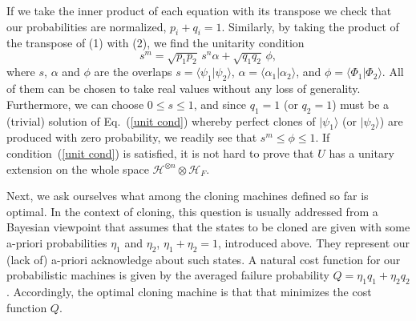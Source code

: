 \documentclass[aps,prl,twocolumn,showpacs]{revtex4}
\newcommand{\tr}{{\rm tr}\,}
\newcommand{\ke}[1]{|#1\rangle}
\newcommand{\bk}[2]{\langle #1|#2\rangle}
\begin{document}


If we take the inner product of each equation with its transpose we check that our probabilities are normalized, $p_i+q_i=1$.
Similarly, by taking the product of the transpose of (1) with (2), we find the unitarity condition
%
\begin{equation}
s^m=\sqrt{p_1 p_2}\, s^n \alpha+\sqrt{q_1 q_2}\,\phi,
\label{unit cond}
\end{equation}
%
where $s$, $\alpha$ and $\phi$ are the overlaps
$s = \bk {\psi_1}{\psi_2}$, $\alpha=\langle\alpha_1|\alpha_2\rangle$, and $ \phi=\langle\Phi_1|\Phi_2\rangle
$. All of them can be chosen to take real values without any loss of generality. Furthermore, we can choose $0\le s\le 1$, and since $q_1=1$ (or $q_2=1$) must be a (trivial) solution of Eq.~(\ref{unit cond}) whereby perfect clones of $|\psi_1\rangle$ (or $|\psi_2\rangle$) are produced with zero probability, we readily see that $s^m\le \phi\le 1$.  If condition~(\ref{unit cond}) is satisfied, it is not hard to prove that $U$ has a unitary extension on the whole space ${\mathscr H}^{\otimes n}\otimes{\mathscr H}_F$. 


Next, we ask ourselves what among the cloning machines defined so far is optimal. In the context of cloning, this question is usually addressed from a Bayesian viewpoint that assumes that the states to be cloned are given with some a-priori  probabilities $\eta_1$ and $\eta_2$, $\eta_1+\eta_2=1$, introduced above. They represent our (lack of) a-priori acknowledge about such states. A natural cost function for our probabilistic machines is given by the averaged failure probability $Q=\eta_1 q_1+\eta_2 q_2$. Accordingly, the optimal cloning machine is that that minimizes the cost function $Q$.
\end{document}
